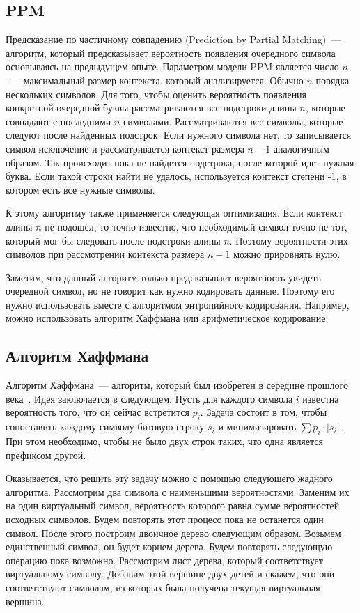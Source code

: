 \subsection{PPM}

Предсказание по частичному совпадению (Prediction by Partial Matching)~--- алгоритм, который предсказывает вероятность появления очередного символа основываясь на предыдущем опыте.
Параметром модели PPM является число $n$~--- максимальный размер контекста, который анализируется. Обычно $n$ порядка нескольких символов. Для того, чтобы оценить вероятность появления 
конкретной очередной буквы рассматриваются все подстроки длины $n$, которые совпадают с последними $n$ символами. Рассматриваются все символы, которые следуют после найденных подстрок.
Если нужного символа нет, то записывается символ-исключение и рассматривается контекст размера $n - 1$ аналогичным образом. Так происходит пока не найдется подстрока, после которой идет 
нужная буква. Если такой строки найти не удалось, используется контекст степени -1, в котором есть все нужные символы.

К этому алгоритму также применяется следующая оптимизация. Если контекст длины $n$ не подошел, то точно известно, что необходимый символ точно не тот, который мог бы следовать после подстроки 
длины $n$. Поэтому вероятности этих символов при рассмотрении контекста размера $n - 1$ можно прировнять нулю.

Заметим, что данный алгоритм только предсказывает вероятность увидеть очередной символ, но не говорит как нужно кодировать данные.
Поэтому его нужно использовать вместе с алгоритмом энтропийного кодирования. Например, можно использовать алгоритм Хаффмана или арифметическое кодирование.

\subsection{Алгоритм Хаффмана}

Алгоритм Хаффмана~--- алгоритм, который был изобретен в середине прошлого века~\cite{huffman}. Идея заключается в следующем.
Пусть для каждого символа $i$ известна вероятность того, что он сейчас встретится $p_i$. Задача состоит в том,
чтобы сопоставить каждому символу битовую строку $s_i$ и минимизировать $\sum{p_i \cdot |s_i|}$. При этом необходимо,
чтобы не было двух строк таких, что одна является префиксом другой.

Оказывается, что решить эту задачу можно с помощью следующего жадного алгоритма. Рассмотрим два символа с
наименьшими вероятностями. Заменим их на один виртуальный символ, вероятность которого равна сумме вероятностей
исходных символов. Будем повторять этот процесс пока не останется один символ. После этого построим двоичное дерево 
следующим образом. Возьмем единственный символ, он будет корнем дерева. Будем повторять следующую операцию пока возможно.
Рассмотрим лист дерева, который соответствует виртуальному символу. Добавим этой вершине двух детей и скажем, что они
соответствуют символам, из которых была получена текущая виртуальная вершина.


